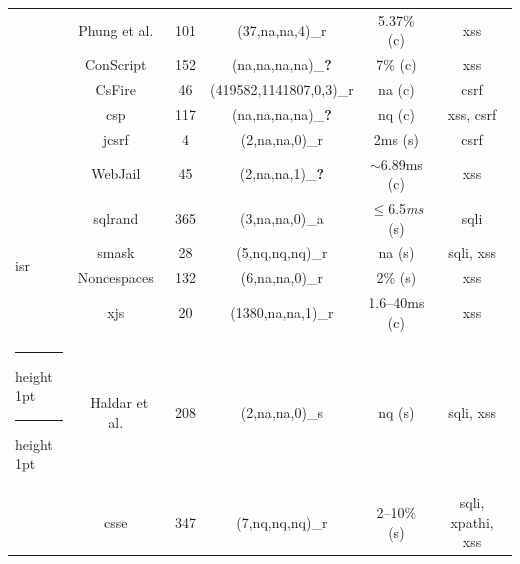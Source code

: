 \documentclass[10pt,journal,compsoc]{IEEEtran}
\makeatletter
\newcommand{\thickhline}{%
    \noalign {\ifnum 0=`}\fi \hrule height 1pt
    \futurelet \reserved@a \@xhline
}
\makeatother
\begin{document}
\begin{table}[t]
\begin{threeparttable}
\begin{small}
{\begin{tabular}{l|c|c|cc|c}
  &   Phung et al.~\cite{PSC09} & 101 & (37,{\sc na},{\sc na},4)\_r & 5.37\% ({\sc c}) & {\sc xss} \\
  &   ConScript~\cite{ML10} & 152 & ({\sc na},{\sc na},{\sc na},{\sc na})\_{\bf ?} & 7\% ({\sc c}) & {\sc xss} \\
  &   CsFire~\cite{DDHPJ10} & 46 & (419582,1141807,0,3)\_r\tnote{5} & {\sc na} ({\sc c}) & {\sc csrf} \\
  &   {\sc csp}~\cite{SSM10} & 117 & ({\sc na},{\sc na},{\sc na},{\sc na})\_{\bf ?} & {\sc nq} ({\sc c}) & {\sc xss}, {\sc csrf} \\
  &   j{\sc csrf}~\cite{PS11} & 4 & (2,{\sc na},{\sc na},0)\_r & 2ms ({\sc s}) & {\sc csrf} \\
  &   WebJail~\cite{VDDPJ11} & 45 & (2,{\sc na},{\sc na},1)\_{\bf ?} & $\sim$6.89ms ({\sc c}) & {\sc xss} \\
  \hline
  \multirow{4}{*}{{\sc isr}}
  &   {\sc sql}rand~\cite{BK04} & 365 & (3,{\sc na},{\sc na},0)\_a & $\le$6.5{\it ms} ({\sc s}) & {\sc sql}i \\
  &   {\sc sm}ask~\cite{JB07} & 28 & (5,{\sc nq},{\sc nq},{\sc nq})\_r  & {\sc na} ({\sc s}) & {\sc sql}i, {\sc xss} \\
  &   Noncespaces~\cite{GC09} & 132 & (6,{\sc na},{\sc na},0)\_r &  2\% ({\sc s}) & {\sc xss} \\ 
  &   x{\sc js}~\cite{APKLM10} & 20 & (1380,{\sc na},{\sc na},1)\_r & 1.6--40ms ({\sc c}) & {\sc xss} \\
  \thickhline
  \thickhline
  \multirow{7}{*}{Taint Tracking}
  &   Haldar et al.~\cite{HCF05} & 208 & (2,{\sc na},{\sc na},0)\_s & {\sc nq} ({\sc s}) & {\sc sql}i, {\sc xss} \\ 
  &   {\sc csse}~\cite{PB05} & 347 & (7,{\sc nq},{\sc nq},{\sc nq})\_r & 2--10\% ({\sc s}) & {\sc sql}i, {\sc xp}athi, {\sc xss} \\

\end{tabular}}
\end{small}
\end{threeparttable}
\end{table}
\end{document}
